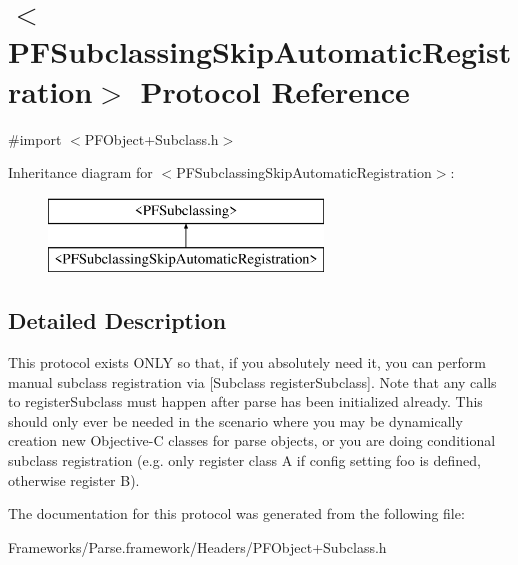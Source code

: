 \hypertarget{protocol_p_f_subclassing_skip_automatic_registration-p}{}\section{$<$P\+F\+Subclassing\+Skip\+Automatic\+Registration$>$ Protocol Reference}
\label{protocol_p_f_subclassing_skip_automatic_registration-p}


{\ttfamily \#import $<$P\+F\+Object+\+Subclass.\+h$>$}

Inheritance diagram for $<$P\+F\+Subclassing\+Skip\+Automatic\+Registration$>$\+:\begin{figure}[H]
\begin{center}
\leavevmode
\includegraphics[height=2.000000cm]{protocol_p_f_subclassing_skip_automatic_registration-p}
\end{center}
\end{figure}


\subsection{Detailed Description}
This protocol exists O\+N\+L\+Y so that, if you absolutely need it, you can perform manual subclass registration via {\ttfamily \mbox{[}Subclass register\+Subclass\mbox{]}}. Note that any calls to {\ttfamily register\+Subclass} must happen after parse has been initialized already. This should only ever be needed in the scenario where you may be dynamically creation new Objective-\/\+C classes for parse objects, or you are doing conditional subclass registration (e.\+g. only register class A if config setting \textquotesingle{}foo\textquotesingle{} is defined, otherwise register B). 

The documentation for this protocol was generated from the following file\+:\begin{DoxyCompactItemize}
\item 
Frameworks/\+Parse.\+framework/\+Headers/P\+F\+Object+\+Subclass.\+h\end{DoxyCompactItemize}
